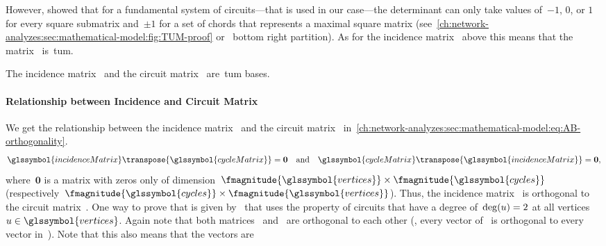 \noindent However, \textcite{Ced55} showed that for a fundamental system of
circuits---that is used in our case---the determinant can only take values
of~$-1$, $0$, or $1$ for every square submatrix and~$\pm 1$ for a set of chords
that represents a maximal square matrix
(see~\cref{ch:network-analyzes:sec:mathematical-model:fig:TUM-proof}
or~ bottom right partition). As for the incidence
matrix~ above this means that the
matrix~ is~\gls{tum}.
% 
\begin{lemma}
    The incidence matrix~ and the
    circuit matrix~ are~\gls{tum} bases.
    \label{ch:network-analyzes:sec:mathematical-model:lem:I-and-B-TUM-sep}
\end{lemma}
%
\paragraph{Relationship between Incidence and Circuit Matrix}
\label{ch:network-analyzes:sec:mathematical-model:paragraph:relationsship-i-c-m}
% 
We get the relationship between the incidence matrix~
and the circuit matrix~
in~\cref{ch:network-analyzes:sec:mathematical-model:eq:AB-orthogonality}.
% 
\begin{align}
    \glssymbol{incidenceMatrix}
    \transpose{\glssymbol{cycleMatrix}} 
    = 
    \mathbf{0}
    \quad
    \text{and}
    \quad
    \glssymbol{cycleMatrix}
    \transpose{\glssymbol{incidenceMatrix}} 
    = 
    \mathbf{0},
    \label{ch:network-analyzes:sec:mathematical-model:eq:AB-orthogonality}
\end{align}
% 
where~$\mathbf{0}$ is a matrix with zeros only of
dimension~$\fmagnitude{\glssymbol{vertices}}\times\fmagnitude{\glssymbol{cycles}}$
(respectively~$\fmagnitude{\glssymbol{cycles}}\times\fmagnitude{\glssymbol{vertices}}$).
Thus, the incidence matrix~ is orthogonal to the
circuit matrix~. One way to prove that is given
by~\textcite[p.66; Theorem 4-6]{Ses61} that uses the property of circuits that
have a degree of~$\operatorname{deg}(u) = 2$ at all
vertices~$\vertexa\in\glssymbol{vertices}$.
% 
Again note that both matrices~
and~ are orthogonal to each other (\ie, every vector
of~ is orthogonal to every vector
in~). Note that this also means that the vectors are
